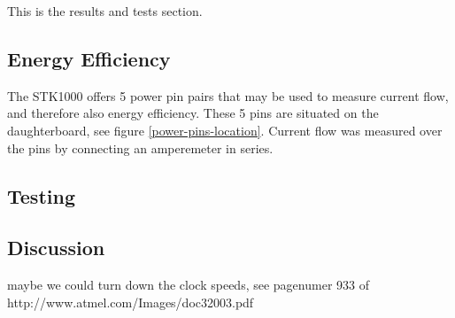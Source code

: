 
This is the results and tests section.

\subsection{Energy Efficiency}

The STK1000 offers 5 power pin pairs that may be used to measure current flow, and therefore also energy efficiency.
These 5 pins are situated on the daughterboard, see figure \ref{power-pins-location}.
Current flow was measured over the pins by connecting an amperemeter in series.

\subsection{Testing}

	


\subsection{Discussion}

maybe we could turn down the clock speeds, see pagenumer 933 of http://www.atmel.com/Images/doc32003.pdf

